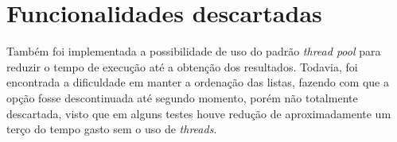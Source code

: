 \section{Funcionalidades descartadas}

Também foi implementada a possibilidade de uso do padrão \textit{thread pool} para reduzir o tempo de execução até a obtenção dos resultados. Todavia, foi encontrada a dificuldade em manter a ordenação das listas, fazendo com que a opção fosse descontinuada até segundo momento, porém não totalmente descartada, visto que em alguns testes houve redução de aproximadamente um terço do tempo gasto sem o uso de \textit{threads}. 
